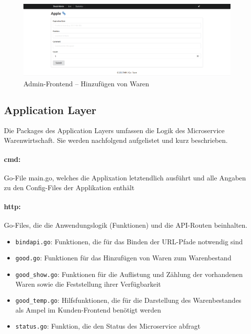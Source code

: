 \begin{figure}[H]
	\centering
	\includegraphics[width=0.65 \textwidth]{./pics/add.png}
	\caption{Admin-Frontend -- Hinzufügen von Waren}
	\label{pic:Admin-Frontend -- Hinzufuegen von Waren}
\end{figure}


\newpage
\subsection{Application Layer}
\label{subsec: Application Layer}
Die Packages des Application Layers umfassen die Logik des Microservice Warenwirtschaft. Sie werden nachfolgend aufgelistet und kurz beschrieben.

\paragraph{cmd:} Go-File main.go, welches die Applixation letztendlich ausführt und alle Angaben zu den Config-Files der Applikation enthält

\paragraph{http:} Go-Files, die die Anwendungslogik (Funktionen) und die API-Routen beinhalten.
	\begin{itemize}
	\item \texttt{bindapi.go}: Funktionen, die für das Binden der URL-Pfade notwendig sind
	\item \texttt{good.go}: Funktionen für das Hinzufügen von Waren zum Warenbestand
	\item \texttt{good\_show.go}: Funktionen für die Auflistung und Zählung der vorhandenen Waren sowie die Feststellung ihrer Verfügbarkeit
	\item \texttt{good\_temp.go}: Hilfsfunktionen, die für die Darstellung des Warenbestandes als Ampel im Kunden-Frontend benötigt werden
	\item \texttt{status.go}: Funktion, die den Status des Microservice abfragt 
	\end{itemize}


